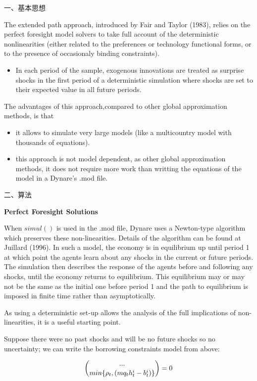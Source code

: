 \documentclass[cn,10pt,math=newtx,citestyle=gb7714-2015,bibstyle=gb7714-2015]{elegantbook}
\begin{document}
一、基本思想

The extended path approach, introduced by Fair and Taylor (1983), relies on the perfect foresight model solvers to take full account of the deterministic nonlinearities (either related to the preferences or technology functional forms, or to the presence of occasionaly binding constraints).

\begin{itemize}
	\item In each period of the sample, exogenous innovations are treated as surprise shocks in the first period of a deterministic simulation where shocks are set to their expected value in all future periods.
\end{itemize}

The advantages of this approach,compared to other global approximation methods, is that

\begin{itemize}
	\item it allows to simulate very large models (like a multicountry model with thousands of equations).
	\item this approach is not model dependent, as other global approximation methods, it does not require more work than writting the equations of the model in a Dynare’s .mod file.
\end{itemize}

二、算法

\textbf{Perfect Foresight Solutions}

When $simul()$ is used in the .mod file, Dynare uses a Newton-type algorithm which preserves these non-linearities. Details of the algorithm can be found at Juillard (1996). In such a model, the economy is in equilibrium up until period 1 at which point the agents learn about any shocks in the current or
future periods. The simulation then describes the response of the agents before and following any shocks, until the economy returns to equilibrium. This equilibrium may or may not be the same as the initial one before period 1 and the path to equilibrium is imposed in finite time rather than asymptotically.

As using a deterministic set-up allows the analysis of the full implications of non-linearities, it is a useful starting point.

Suppose there were no past shocks and will be no future shocks so no uncertainty; we can write the borrowing constraints model from above:

$$\dbinom{...}{min\{\rho_t,(mq_th_t^i-b_t^i)\}}=0$$
\end{document}
